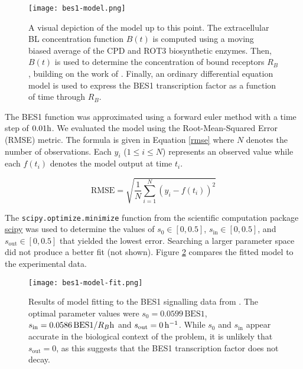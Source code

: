 \begin{figure}[!hbt]
    \centering
    \texttt{[image: bes1-model.png]}
    \caption{A visual depiction of the model up to this point. The extracellular BL concentration function $B(t)$ is computed using a moving biased average of the CPD and ROT3 biosynthetic enzymes. Then, $B(t)$ is used to determine the concentration of bound receptors $R_{B}$, building on the work of \cite{vanesse2012}. Finally, an ordinary differential equation model is used to express the BES1 transcription factor as a function of time through $R_{B}$.}
    \label{fig:bes1-model}
\end{figure}

\medskip

The BES1 function was approximated using a forward euler method with a time step of $0.01\h$. We evaluated the model using the Root-Mean-Squared Error (RMSE) metric. The formula is given in Equation \eqref{rmse} where $N$ denotes the number of observations. Each $y_{i}$ ($1 \leq i \leq N$) represents an observed value while each $f(t_{i})$ denotes the model output at time $t_{i}$.

\begin{equation}
\label{rmse}
\text{RMSE} =  \sqrt{\frac{1}{N}\sum_{i = 1}^{N} (y_{i} - f(t_{i}))^{2}}
\end{equation}

The \verb|scipy.optimize.minimize| function from the scientific computation package \href{https://scipy.org/}{scipy} was used to determine the values of $s_{0} \in [0, 0.5]$, $s_{\text{in}} \in [0, 0.5]$, and $s_{\text{out}} \in [0, 0.5]$ that yielded the lowest error. Searching a larger parameter space did not produce a better fit (not shown). Figure \ref{fig:bes1-model-fit} compares the fitted model to the experimental data. 

\begin{figure}[!hbt]
    \centering
    \texttt{[image: bes1-model-fit.png]}
    \caption{Results of model fitting to the BES1 signalling data from \cite{vukasinovic2021}. The optimal parameter values were $s_{0} = 0.0599\,\text{BES1}$, $s_{\text{in}} = 0.0586\,\text{BES1}/R_{B}\h$ and $s_{\text{out}} = 0\,\ph$. While $s_{0}$ and $s_{\text{in}}$ appear accurate in the biological context of the problem, it is unlikely that $s_{\text{out}} = 0$, as this suggests that the BES1 transcription factor does not decay.  }
    \label{fig:bes1-model-fit}
\end{figure}

\medskip

